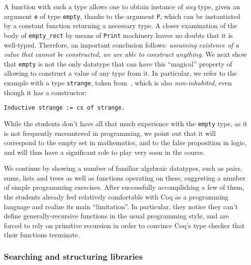 \documentclass[blockstyle,preprint]{sigplanconf}
\newcommand{\an}[1]{\textcolor{red}{(Aleks: {#1})}}
\newcommand{\code}[1]{\lstinline{#1}}
\begin{document}
A function with such a type allows one to obtain instance of
\emph{any} type, given an argument \code{e} of type \code{empty},
thanks to the argument \code{P}, which can be instantiated by a
constant function returning a necessary type. A closer examination of
the body of \code{empty_rect} by means of \code{Print} machinery
leaves no doubts that it is well-typed. Therefore, an important
conclusion follows: \emph{assuming existence of a value that cannot be
  constructed, we are able to construct anything}. We next show that
\code{empty} is not the only datatype that can have this ``magical''
property of allowing to construct a value of any type from it. In
particular, we refer to the example with a type \code{strange}, taken
from~\cite{Bertot-Casteran:BOOK}, which is also \emph{non-inhabited},
even though it has a constructor:
%
\begin{lstlisting}
Inductive strange := cs of strange.
\end{lstlisting}
%
%
%
While the students don't have all that much experience with the
\code{empty} type, as it is not frequently encountered in programming,
we point out that it will correspond to the empty set in mathematics,
and to the false proposition in logic, and will thus have a
significant role to play very soon in the course.

We continue by showing a number of familiar algebraic datatypes, such
as pairs, sums, lists and trees as well as functions operating on
these, suggesting a number of simple programming exercises. After
successfully accomplishing a few of them, the students already feel
relatively comfortable with Coq as a programming language and realize
its main ``limitation''. In particular, they notice they can't define
generally-recursive functions in the usual programming style, and are
forced to rely on primitive recursion in order to convince Coq's type
checker that their functions terminate.

\subsubsection{Searching and structuring libraries}
\label{sec:search-defin}
\end{document}
